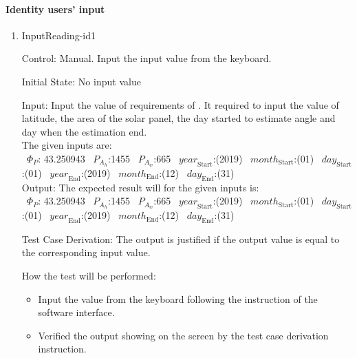 \documentclass[12pt, titlepage]{article}
\begin{document}

\paragraph{Identity users' input}
\begin{enumerate}

\item{InputReading-id1\\}

Control: Manual. Input the input value from the keyboard.
					
Initial State: No input value
					
Input: Input the value of requirements of \progname. It required to input the
value of latitude, the area of the solar panel, the day started to estimate
angle and day when the estimation end.\\

 The given inputs are:\\
 ~$\Phi_P$: 43.250943 
~$P_{A_{h}}$:1455
~$P_{A_{w}}$:665
~$\mathit{year}_\text{Start}$:(2019) ~$\mathit{month}_\text{Start}$:(01) 
~$\mathit{day}_\text{Start}$:(01) ~$\mathit{year}_\text{End}$:(2019) 
~$\mathit{month}_\text{End}$:(12) 
~$\mathit{day}_\text{End}$:(31)\\

 Output: The expected result will for the given inputs is:\\ 
~$\Phi_P$: 43.250943
~$P_{A_{h}}$:1455
~$P_{A_{w}}$:665
~$\mathit{year}_\text{Start}$:(2019) 
~$\mathit{month}_\text{Start}$:(01) 
~$\mathit{day}_\text{Start}$:(01) 
~$\mathit{year}_\text{End}$:(2019) 
~$\mathit{month}_\text{End}$:(12) 
~$\mathit{day}_\text{End}$:(31)\\


Test Case Derivation: The output is justified if the output value is equal to
the corresponding input value.

How the test will be performed:
\begin{itemize}
\item Input the value from the keyboard following the instruction of the
software interface.
\item Verified the output showing on the screen by the test case derivation
instruction. 
\end{itemize}
\end{enumerate}
\end{document}
